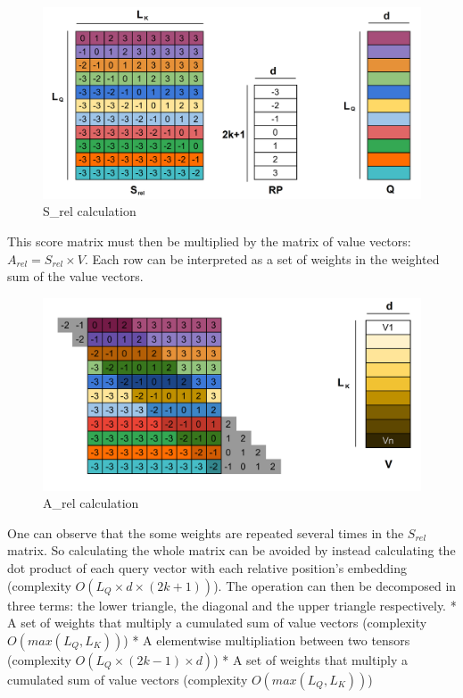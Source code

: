 \begin{figure}
\centering
\includegraphics{images/S_rel.png}
\caption{S\_rel calculation}
\end{figure}

This score matrix must then be multiplied by the matrix of value
vectors: \(A_{rel} = S_{rel} \times V\). Each row can be interpreted as
a set of weights in the weighted sum of the value vectors.

\begin{figure}
\centering
\includegraphics{images/S_rel_V.png}
\caption{A\_rel calculation}
\end{figure}

One can observe that the some weights are repeated several times in the
\(S_{rel}\) matrix. So calculating the whole matrix can be avoided by
instead calculating the dot product of each query vector with each
relative position's embedding (complexity
\(O \left(L_Q\times d\times(2k+1)\right)\)). The operation can then be
decomposed in three terms: the lower triangle, the diagonal and the
upper triangle respectively. * A set of weights that multiply a
cumulated sum of value vectors (complexity \(O(max(L_Q, L_K))\)) * A
elementwise multipliation between two tensors (complexity
\(O(L_Q\times (2k-1) \times d)\)) * A set of weights that multiply a
cumulated sum of value vectors (complexity \(O(max(L_Q, L_K))\))

